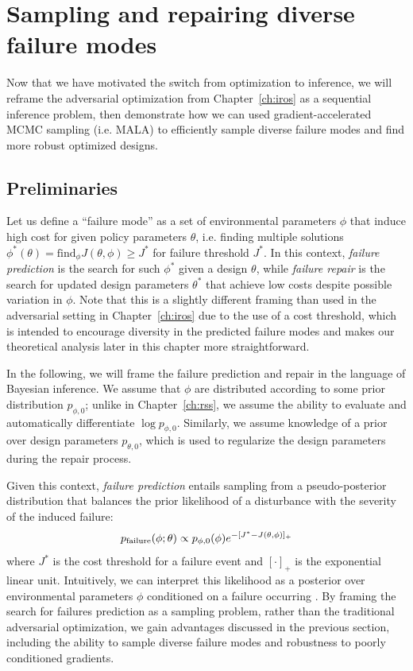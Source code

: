 \section{Sampling and repairing diverse failure modes}

Now that we have motivated the switch from optimization to inference, we will reframe the adversarial optimization from Chapter~\ref{ch:iros} as a sequential inference problem, then demonstrate how we can used gradient-accelerated MCMC sampling (i.e. MALA) to efficiently sample diverse failure modes and find more robust optimized designs.

\subsection{Preliminaries}

Let us define a ``failure mode'' as a set of environmental parameters $\phi$ that induce high cost for given policy parameters $\theta$, i.e. finding multiple solutions $\phi^*(\theta) = \text{find}_\phi J(\theta, \phi) \geq J^*$ for failure threshold $J^*$. In this context, \textit{failure prediction} is the search for such $\phi^*$ given a design $\theta$, while \textit{failure repair} is the search for updated design parameters $\theta^*$ that achieve low costs despite possible variation in $\phi$. Note that this is a slightly different framing than used in the adversarial setting in Chapter~\ref{ch:iros} due to the use of a cost threshold, which is intended to encourage diversity in the predicted failure modes and makes our theoretical analysis later in this chapter more straightforward.

In the following, we will frame the failure prediction and repair in the language of Bayesian inference. We assume that $\phi$ are distributed according to some prior distribution $p_{\phi, 0}$; unlike in Chapter~\ref{ch:rss}, we assume the ability to evaluate and automatically differentiate $\log p_{\phi, 0}$. Similarly, we assume knowledge of a prior over design parameters $p_{\theta, 0}$, which is used to regularize the design parameters during the repair process.

Given this context, \textit{failure prediction} entails sampling from a pseudo-posterior distribution that balances the prior likelihood of a disturbance with the severity of the induced failure:
%
\begin{equation}
    p_{\rm{failure}}(\phi; \theta) \propto p_{\phi, 0}(\phi)e^{-[J^* - J(\theta, \phi)]_+} \label{ch:corl:eq:failure_logprob_basic}
\end{equation}
%
where $J^*$ is the cost threshold for a failure event and $[\cdot]_+$ is the exponential linear unit. Intuitively, we can interpret this likelihood as a posterior over environmental parameters $\phi$ conditioned on a failure occurring \cite{sinhaNeuralBridgeSampling2020,zhouRoCUSRobotController2021,maSamplingCanBe2019,dawsonBayesianApproachBreaking2023}. By framing the search for failures prediction as a sampling problem, rather than the traditional adversarial optimization, we gain advantages discussed in the previous section, including the ability to sample diverse failure modes and robustness to poorly conditioned gradients.

